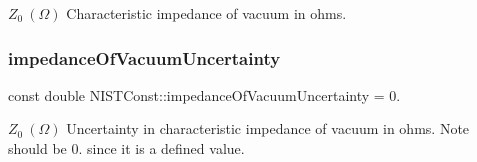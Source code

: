 $Z_0 \ (\Omega)$ Characteristic impedance of vacuum in ohms. \mbox{\label{group___impedance_of_vacuum_ga0d686b0016dc8c1f0bda161283b4f9c5}} 
\subsubsection{\texorpdfstring{impedance\+Of\+Vacuum\+Uncertainty}{impedanceOfVacuumUncertainty}}
{\footnotesize\ttfamily const double N\+I\+S\+T\+Const\+::impedance\+Of\+Vacuum\+Uncertainty = 0.}

$Z_0 \ (\Omega)$ Uncertainty in characteristic impedance of vacuum in ohms. Note should be 0. since it is a defined value. 
